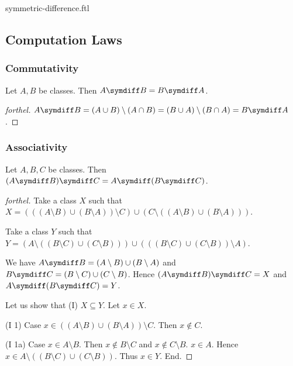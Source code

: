 \documentclass{naproche-library}
\begin{document}
\begin{smodule}{symmetric-difference.ftl}
  \subsection*{Computation Laws}

  \subsubsection*{Commutativity}

  \begin{proposition}[forthel,id=FOUNDATIONS_03_4518372049944576]
    Let $A, B$ be classes.
    Then $A \symdiff B = B \symdiff A$.
  \end{proposition}
  \begin{proof}[forthel]
    $A \symdiff B
      = (A \cup B) \setminus (A \cap B)
      = (B \cup A) \setminus (B \cap A)
      = B \symdiff A$.
  \end{proof}


  \subsubsection*{Associativity}

  \begin{proposition}[forthel,id=FOUNDATIONS_03_8680845204258816]
    Let $A, B, C$ be classes.
    Then $(A \symdiff B) \symdiff C = A \symdiff (B \symdiff C)$.
  \end{proposition}
  \begin{proof}[forthel]
    Take a class $X$ such that $X = (((A \setminus B) \cup (B \setminus A)) \setminus C) \cup (C \setminus ((A \setminus B) \cup (B \setminus A)))$.

    Take a class $Y$ such that $Y = (A \setminus ((B \setminus C) \cup (C \setminus B))) \cup (((B \setminus C) \cup (C \setminus B)) \setminus A)$.

    We have $A \symdiff B = (A \setminus B) \cup (B \setminus A)$ and $B \symdiff C = (B \setminus C) \cup (C \setminus B)$.
    Hence $(A \symdiff B) \symdiff C = X$ and $A \symdiff (B \symdiff C) = Y$.

    Let us show that (I) $X \subseteq Y$.
      Let $x \in X$.

      (I 1) Case $x \in ((A \setminus B) \cup (B \setminus A)) \setminus C$.
        Then $x \notin C$.

        (I 1a) Case $x \in A \setminus B$.
          Then $x \notin B \setminus C$ and $x \notin C \setminus B$. $x \in A$.
          Hence $x \in A \setminus ((B \setminus C) \cup (C \setminus B))$.
          Thus $x \in Y$.
        End.


\end{proof}
\end{smodule}
\end{document}
